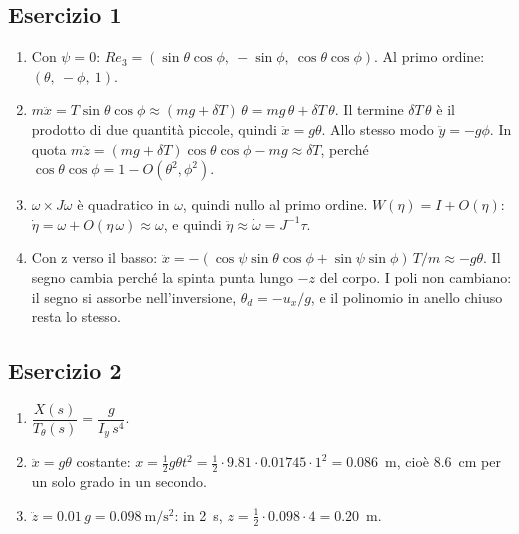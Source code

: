 \documentclass[11pt,a4paper]{article}
\begin{document}
\subsection*{Esercizio 1}
\begin{enumerate}[label=(\alph*)]
  \item Con $\psi = 0$: $R e_3 = (\sin\theta\cos\phi,\ -\sin\phi,\ \cos\theta\cos\phi)$. Al primo ordine: $(\theta,\ -\phi,\ 1)$.
  \item $m\ddot x = T\sin\theta\cos\phi \approx (mg + \delta T)\,\theta = mg\,\theta + \delta T\,\theta$. Il termine $\delta T\,\theta$ è il prodotto di due quantità piccole, quindi $\ddot x = g\theta$. Allo stesso modo $\ddot y = -g\phi$. In quota $m\ddot z = (mg + \delta T)\cos\theta\cos\phi - mg \approx \delta T$, perché $\cos\theta\cos\phi = 1 - O(\theta^2, \phi^2)$.
  \item $\omega \times J\omega$ è quadratico in $\omega$, quindi nullo al primo ordine. $W(\eta) = I + O(\eta)$: $\dot\eta = \omega + O(\eta\,\omega) \approx \omega$, e quindi $\ddot\eta \approx \dot\omega = J^{-1}\tau$.
  \item Con z verso il basso: $\ddot x = -(\cos\psi\sin\theta\cos\phi + \sin\psi\sin\phi)\,T/m \approx -g\theta$. Il segno cambia perché la spinta punta lungo $-z$ del corpo. I poli non cambiano: il segno si assorbe nell'inversione, $\theta_d = -u_x/g$, e il polinomio in anello chiuso resta lo stesso.
\end{enumerate}

\subsection*{Esercizio 2}
\begin{enumerate}[label=(\alph*)]
  \item $\dfrac{X(s)}{T_\theta(s)} = \dfrac{g}{I_y\, s^4}$.
  \item $\ddot x = g\theta$ costante: $x = \tfrac12 g\theta t^2 = \tfrac12 \cdot 9.81 \cdot 0.01745 \cdot 1^2 = 0.086$~m, cioè 8.6~cm per un solo grado in un secondo.
  \item $\ddot z = 0.01\,g = 0.098\ \mathrm{m/s^2}$: in 2~s, $z = \tfrac12 \cdot 0.098 \cdot 4 = 0.20$~m.
\end{enumerate}
\end{document}
